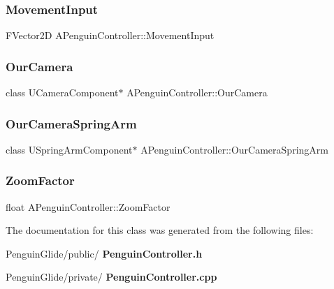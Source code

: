 \mbox{\label{class_a_penguin_controller_ad5e38d4bab697a120a0aec8643aabdea}} 
\subsubsection{MovementInput}
{\footnotesize\ttfamily F\+Vector2D A\+Penguin\+Controller\+::\+Movement\+Input}

\mbox{\label{class_a_penguin_controller_a2b4212713e88cdba7f3ca02844e5a509}} 
\subsubsection{OurCamera}
{\footnotesize\ttfamily class U\+Camera\+Component$\ast$ A\+Penguin\+Controller\+::\+Our\+Camera\hspace{0.3cm}{\ttfamily [protected]}}

\mbox{\label{class_a_penguin_controller_a3a4df57e4b129989aa3becb844437256}} 
\subsubsection{OurCameraSpringArm}
{\footnotesize\ttfamily class U\+Spring\+Arm\+Component$\ast$ A\+Penguin\+Controller\+::\+Our\+Camera\+Spring\+Arm\hspace{0.3cm}{\ttfamily [protected]}}

\mbox{\label{class_a_penguin_controller_a180900572c3dde77c68983f666438fe6}} 
\subsubsection{ZoomFactor}
{\footnotesize\ttfamily float A\+Penguin\+Controller\+::\+Zoom\+Factor}



The documentation for this class was generated from the following files\+:\begin{DoxyCompactItemize}
\item 
Penguin\+Glide/public/\textbf{ Penguin\+Controller.\+h}\item 
Penguin\+Glide/private/\textbf{ Penguin\+Controller.\+cpp}\end{DoxyCompactItemize}
